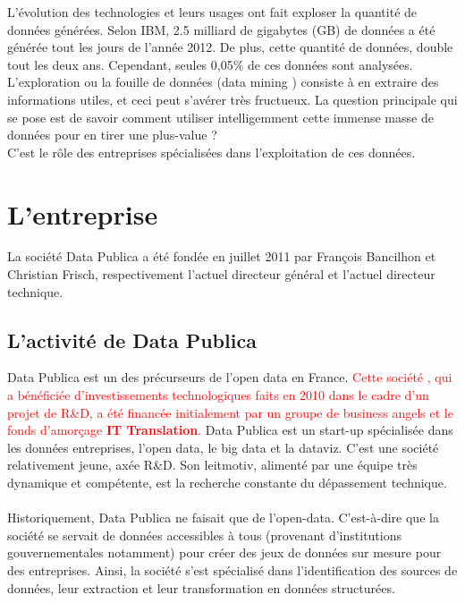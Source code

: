 L’évolution des technologies et leurs usages ont fait exploser la quantité de données générées. Selon IBM, 2.5 milliard de gigabytes (GB) de données a été générée tout les jours de l'année 2012. De plus, cette quantité de données, double tout les deux ans. Cependant, seules 0,05\% de ces données sont analysées.\\

L’exploration ou la fouille de données (\og data mining \fg) consiste à en extraire des informations utiles, et ceci peut s’avérer très fructueux. La question principale qui se pose est de savoir comment utiliser intelligemment cette immense masse de données pour en tirer une plus-value ?\\
C’est le rôle des entreprises spécialisées dans l'exploitation de ces données.

\section{L'entreprise}
    La société Data Publica a été fondée en juillet 2011 par François Bancilhon et Christian Frisch, respectivement l'actuel directeur général et l'actuel directeur technique.

    \subsection{L'activité de Data Publica}
        Data Publica est un des précurseurs de l'open data en France. \textcolor{red}{Cette société , qui a bénéficiée d’investissements technologiques faits en 2010 dans le cadre d’un projet de R\&D, a été financée initialement par un groupe de business angels et le fonds d’amorçage \textbf{IT Translation}.}
        Data Publica est un start-up spécialisée dans les données entreprises, l'open data, le big data et la dataviz. C'est une société relativement jeune, axée R\&D. Son leitmotiv, alimenté par une équipe très dynamique et compétente, est la recherche constante du dépassement technique.

        \paragraph{}
            Historiquement, Data Publica ne faisait que de l'open-data. C'est-à-dire que la société se servait de données accessibles à tous (provenant d'institutions gouvernementales notamment) pour créer des jeux de données sur mesure pour des entreprises. Ainsi, la société s'est spécialisé dans l'identification des sources de données, leur extraction et leur transformation en données structurées.

